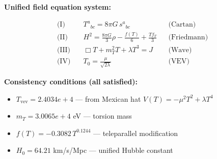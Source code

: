
\textbf{Unified field equation system:}

\begin{align}
  \text{(I)} \quad & T^a{}_{bc} = 8\pi G \, s^a{}_{bc} && \text{(Cartan)} \\
  \text{(II)} \quad & H^2 = \frac{8\pi G}{3}\rho - \frac{f(T)}{6} + \frac{Tf_T}{3} && \text{(Friedmann)} \\
  \text{(III)} \quad & \Box T + m_T^2 T + \lambda T^3 = J && \text{(Wave)} \\
  \text{(IV)} \quad & T_0 = \frac{\mu}{\sqrt{2\lambda}} && \text{(VEV)}
\end{align}

\textbf{Consistency conditions (all satisfied):}
\begin{itemize}
  \item $T_{\text{vev}} = 2.4034e+4$ — from Mexican hat $V(T) = -\mu^2 T^2 + \lambda T^4$
  \item $m_T = 3.0065e+4$ eV — torsion mass
  \item $f(T) = -0.3082 \, T^{0.1244}$ — teleparallel modification
  \item $H_0 = 64.21$ km/s/Mpc — unified Hubble constant
\end{itemize}